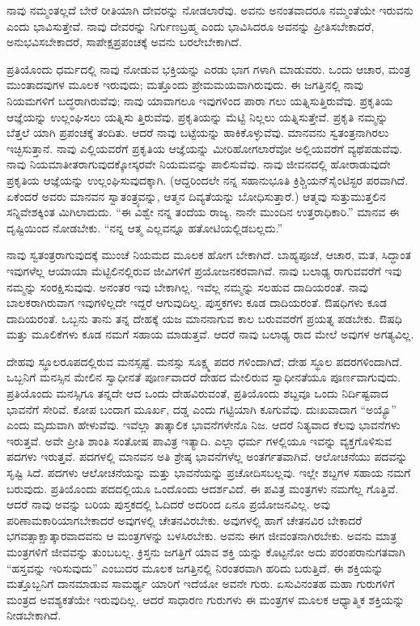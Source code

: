ನಾವು ನಮ್ಮಂತಲ್ಲದೆ ಬೇರೆ ರೀತಿಯಾಗಿ ದೇವರನ್ನು ನೋಡಲಾರೆವು. ಅವನು ಅನಂತವಾದರೂ ನಮ್ಮಂತೆಯೇ ಇರುವನು ಎಂದು ಭಾವಿಸುತ್ತೇವೆ. ನಾವು ದೇವರನ್ನು ನಿರ್ಗುಣಬ್ರಹ್ಮ ಎಂದು ಭಾವಿಸಿದರೂ ಅವನನ್ನು ಪ್ರೀತಿಸಬೇಕಾದರೆ, ಅನುಭವಿಸಬೇಕಾದರೆ, ಸಾಪೇಕ್ಷಪ್ರಪಂಚಕ್ಕೆ ಅವನು ಬರಲೇಬೇಕಾಗಿದೆ.

ಪ್ರತಿಯೊಂದು ಧರ್ಮದಲ್ಲಿ ನಾವು ನೋಡುವ ಭಕ್ತಿಯನ್ನು ಎರಡು ಭಾಗ ಗಳಾಗಿ ಮಾಡುವರು. ಒಂದು ಆಚಾರ, ಮಂತ್ರ ಮುಂತಾದವುಗಳ ಮೂಲಕ ಇರುವುದು; ಮತ್ತೊಂದು ಪ್ರೇಮಮಯವಾಗಿರುವುದು. ಈ ಜಗತ್ತಿನಲ್ಲಿ ನಾವು ನಿಯಮಗಳಿಗೆ ಬದ್ಧರಾಗಿರುವೆವು; ನಾವು ಯಾವಾಗಲೂ ಇವುಗಳಿಂದ ಪಾರಾ ಗಲು ಯತ್ನಿಸುತ್ತಿರುವೆವು. ಪ್ರಕೃತಿಯ ಆಜ್ಞೆಯನ್ನು ಉಲ್ಲಂಘಿಸಲು ಯತ್ನಿಸು ತ್ತಿರುವೆವು. ಪ್ರಕೃತಿಯನ್ನು ಮೆಟ್ಟಿ ನಿಲ್ಲಲು ಯತ್ನಿಸುತ್ತೇವೆ. ಪ್ರಕೃತಿ ನಮ್ಮನ್ನು ಬೆತ್ತಲೆ ಯಾಗಿ ಪ್ರಪಂಚಕ್ಕೆ ತಂದಿತು. ಆದರೆ ನಾವು ಬಟ್ಟೆಯನ್ನು ಹಾಕಿಕೊಳ್ಳುವೆವು. ಮಾನವನು ಸ್ವತಂತ್ರನಾಗಿರಲು ಇಚ್ಛಿಸುತ್ತಾನೆ. ನಾವು ಎಲ್ಲಿಯವರೆಗೆ ಪ್ರಕೃತಿಯ ಆಜ್ಞೆಯನ್ನು ಮೀರಿಹೋಗಲಾರೆವೋ ಅಲ್ಲಿಯವರೆಗೆ ವ್ಯಥೆಪಡುವೆವು. ನಾವು ನಿಯಮಾತೀತರಾಗುವುದಕ್ಕೋಸ್ಕರವೇ ನಿಯಮವನ್ನು ಪಾಲಿಸುವೆವು. ನಾವು ಜೀವನದಲ್ಲಿ ಹೋರಾಡುವುದೇ ಪ್ರಕೃತಿಯ ಆಜ್ಞೆಯನ್ನು ಉಲ್ಲಂಘಿಸುವುದಕ್ಕಾಗಿ. (ಆದ್ದರಿಂದಲೇ ನನ್ನ ಸಹಾನುಭೂತಿ ಕ್ರಿಶ್ಚಿಯನ್​ ಸೈಂಟಿಸ್ಟರ ಪರವಾಗಿದೆ. ಏಕೆಂದರೆ ಅವರು ಮಾನವನ ಸ್ವಾತಂತ್ರ್ಯವನ್ನು, ಆತ್ಮನ ದಿವ್ಯತೆಯನ್ನು ಬೋಧಿಸುತ್ತಾರೆ.) ಆತ್ಮವು ಸುತ್ತುಮುತ್ತಲಿನ ಸನ್ನಿವೇಶಕ್ಕಿಂತ ಮಿಗಿಲಾದುದು. “ಈ ವಿಶ್ವೇ ನನ್ನ ತಂದೆಯ ರಾಜ್ಯ. ನಾನೇ ಮುಂದಿನ ಉತ್ತರಾಧಿಕಾರಿ.” ಮಾನವ ಈ ದೃಷ್ಟಿಯಿಂದ ನೋಡಬೇಕು. “ನನ್ನ ಆತ್ಮ ಎಲ್ಲವನ್ನೂ ಹತೋಟಿಯಲ್ಲಿಡಬಲ್ಲದು.”

ನಾವು ಸ್ವತಂತ್ರರಾಗುವುದಕ್ಕೆ ಮುಂಚೆ ನಿಯಮದ ಮೂಲಕ ಹೋಗ ಬೇಕಾಗಿದೆ. ಬಾಹ್ಯಪೂಜೆ, ಆಚಾರ, ಮತ, ಸಿದ್ಧಾಂತ ಇವುಗಳೆಲ್ಲ ಆಯಾಯಾ ಮೆಟ್ಟಿಲಿನಲ್ಲಿರುವ ಜೀವಿಗಳಿಗೆ ಪ್ರಯೋಜನಕರವಾಗಿವೆ. ನಾವು ಬಲಾಢ್ಯ ರಾಗುವವರೆಗೆ ಇವು ನಮ್ಮನ್ನು ಸಂರಕ್ಷಿಸುವುವು. ಅನಂತರ ಇವು ಬೇಕಾಗಿಲ್ಲ. ಇವೆಲ್ಲ ನಮ್ಮನ್ನು ಸಲಹುವ ದಾದಿಯರಂತೆ. ನಾವು ಬಾಲಕರಾಗಿರುವಾಗ ಇವುಗಳಿಲ್ಲದೇ ಇದ್ದರೆ ಆಗುವುದಿಲ್ಲ. ಪುಸ್ತಕಗಳು ಕೂಡ ದಾದಿಯರಂತೆ. ಔಷಧಿಗಳು ಕೂಡ ದಾದಿಯರಂತೆ. ಒಬ್ಬನು ತಾನು ತನ್ನ ದೇಹಕ್ಕೆ ಯಜ ಮಾನನಾಗುವ ಕಾಲ ಬರುವವರೆಗೆ ಪ್ರಯತ್ನ ಪಡಬೇಕು. ಔಷಧಿ ಮತ್ತು ಮೂಲಿಕೆಗಳು ಕೂಡ ನಮಗೆ ಸಹಾಯ ಮಾಡುತ್ತವೆ. ಆದರೆ ನಾವು ಬಲಾಢ್ಯ ರಾದ ಮೇಲೆ ಅವುಗಳ ಅಗತ್ಯವಿಲ್ಲ.

ದೇಹವು ಸ್ಥೂಲರೂಪದಲ್ಲಿರುವ ಮನಸ್ಸಷ್ಟೆ. ಮನಸ್ಸು ಸೂಕ್ಷ್ಮ ಪದರ ಗಳಿಂದಾಗಿದೆ; ದೇಹ ಸ್ಥೂಲ ಪದರಗಳಿಂದಾಗಿದೆ. ಒಬ್ಬನಿಗೆ ಮನಸ್ಸಿನ ಮೇಲಿನ ಸ್ವಾಧೀನತೆ ಪೂರ್ಣವಾದರೆ ದೇಹದ ಮೇಲಿರುವ ಸ್ವಾಧೀನತೆಯೂ ಪೂರ್ಣವಾಗುವುದು. ಪ್ರತಿಯೊಂದು ಮನಸ್ಸಿಗೂ ತನ್ನದೇ ಆದ ಒಂದು ದೇಹವಿರುವಂತೆ, ಪ್ರತಿಯೊಂದು ಶಬ್ದವೂ ಒಂದು ನಿರ್ದಿಷ್ಟವಾದ ಭಾವನೆಗೆ ಸೇರಿವೆ. ಕೋಪ ಬಂದಾಗ ಮೂರ್ಖ, ದಡ್ಡ ಎಂದು ಗಟ್ಟಿಯಾಗಿ ಕೂಗುವೆವು. ದುಃಖವಾದಾಗ “ಅಯ್ಯೊ” ಎಂದು ಮೃದುವಾಗಿ ಹೇಳುವೆವು. ಇವೆಲ್ಲಾ ತಾತ್ಕಾಲಿಕ ಭಾವನೆಗಳೇನೊ ನಿಜ. ಆದರೆ ನಿತ್ಯವಾದ ಕೆಲವು ಭಾವನೆಗಳು ಇರುತ್ತವೆ. ಅವೇ ಪ್ರೀತಿ ಶಾಂತಿ ಸಂತೋಷ ಪಾವಿತ್ರ ಇತ್ಯಾದಿ. ಎಲ್ಲಾ ಧರ್ಮ ಗಳಲ್ಲಿಯೂ ಇವನ್ನು ವ್ಯಕ್ತಗೊಳಿಸುವ ಪದಗಳು ಇರುತ್ತವೆ. ಪದಗಳಲ್ಲಿ ಮಾನವನ ಅತಿ ಶ್ರೇಷ್ಠ ಭಾವನೆಗಳೆಲ್ಲ ಅಂತರ್ಗತವಾಗಿವೆ. ಆಲೋಚನೆಯು ಪದವನ್ನು ಸೃಷ್ಟಿ ಸಿದೆ. ಪದಗಳು ಆಲೋಚನೆಯನ್ನು ಮತ್ತು ಭಾವನೆಯನ್ನು ಪ್ರಚೋದಿಸಬಲ್ಲವು. ಇಲ್ಲೇ ಶಬ್ದಗಳ ಸಹಾಯ ನಮಗೆ ಬರುವುದು. ಪ್ರತಿಯೊಂದು ಪದದಲ್ಲಿಯೂ ಒಂದೊಂದು ಆದರ್ಶವಿದೆ. ಈ ಪವಿತ್ರ ಮಂತ್ರಗಳು ನಮಗೆಲ್ಲ ಗೊತ್ತಿವೆ. ಆದರೆ ನಾವು ಅವನ್ನು ಬರಿಯ ಪುಸ್ತಕದಲ್ಲಿ ಓದಿದರೆ ಅದರಿಂದ ಏನೂ ಪ್ರಯೋಜನವಿಲ್ಲ. ಅವು ಪರಿಣಾಮಕಾರಿಯಾಗಬೇಕಾದರೆ ಅವುಗಳಲ್ಲಿ ಚೇತನವಿರಬೇಕು. ಅವುಗಳಲ್ಲಿ ಹಾಗೆ ಚೇತನವಿರ ಬೇಕಾದರೆ ಭಗವತ್ಸಾಕ್ಷಾತ್ಕಾರವಾದವನು ಆ ಮಂತ್ರಗಳನ್ನು ಬಳಸಿರಬೇಕು. ಅವನು ಈಗ ಜೀವಂತನಾಗಿರಬೇಕು. ಅವನು ಮಾತ್ರ ಮಂತ್ರಗಳಿಗೆ ಜೀವವನ್ನು ತುಂಬಬಲ್ಲ. ಕ್ರಿಸ್ತನು ಜಗತ್ತಿಗೆ ಯಾವ ಶಕ್ತಿ ಯನ್ನು ಕೊಟ್ಟನೋ ಅದು ಪರಂಪರಾನುಗತವಾಗಿ “ಹಸ್ತವನ್ನು ಇರಿಸುವುದು” ಎಂಬುದರ ಮೂಲಕ ಜಗತ್ತಿನಲ್ಲಿ ನಿರಂತರವಾಗಿ ಹರಿದು ಬರುತ್ತಿದೆ. ಈ ಶಕ್ತಿಯನ್ನು ಮತ್ತೊಬ್ಬನಿಗೆ ದಾನಮಾಡುವ ಸಾಮರ್ಥ್ಯ ಯಾರಿಗೆ ಇದೆಯೋ ಅವನೇ ಗುರು. ಏಸುವಿನಂತಹ ಮಹಾ ಗುರುಗಳಿಗೆ ಮಂತ್ರದ ಅವಶ್ಯಕತೆಯೇ ಇರುವುದಿಲ್ಲ. ಆದರೆ ಸಾಧಾರಣ ಗುರುಗಳು ಈ ಮಂತ್ರಗಳ ಮೂಲಕ ಆಧ್ಯಾತ್ಮಿಕ ಶಕ್ತಿಯನ್ನು ನೀಡಬೇಕಾಗಿದೆ.

